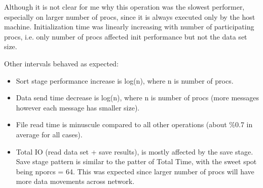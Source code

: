 \documentclass{article}
\begin{document}
\noindent Although it is not clear for me why this operation was the slowest performer,
especially on larger
number of procs, since it is always executed only by the host machine.
Initialization time was linearly increasing with number of participating
procs, i.e. only number of procs affected init performance but not the data set size.


\vspace{0.5cm}

Other intervals behaved as expected:

\begin{itemize}
\item Sort stage performance increase is log(n), where n is number of procs. 
\item Data send time decrease is log(n), where n is number of procs (more messages however
each message has smaller size).
\item File read time is minuscule compared to all other operations (about \%0.7 in average
for all cases).
\item Total IO (read data set + save results), is mostly affected by the save stage. Save
stage pattern is similar to the patter of Total Time, with the sweet spot being nporcs = 64.
This was expected since larger number of procs will have more data movements across network.
\end{itemize}
\end{document}
